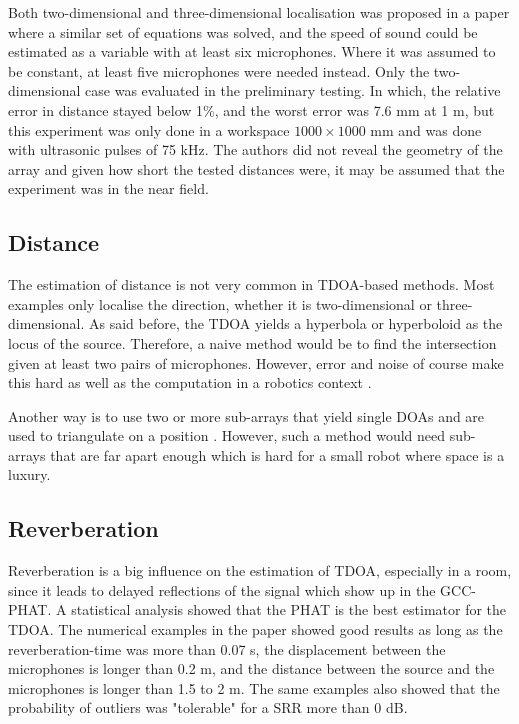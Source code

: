 \documentclass[notitlepage]{report}
\begin{document}
Both two-dimensional and three-dimensional localisation was proposed in a paper \cite{mahajan_3d_2001} where a similar set of equations was solved, and the speed of sound could be estimated as a variable with at least six microphones. Where it was assumed to be constant, at least five microphones were needed instead. Only the two-dimensional case was evaluated in the preliminary testing. In which, the relative error in distance stayed below 1\%, and the worst error was 7.6 \si{mm} at 1 \si{m}, but this experiment was only done in a workspace $1000\times 1000$ \si{mm} and was done with ultrasonic pulses of 75 \si{kHz}. The authors did not reveal the geometry of the array and given how short the tested distances were, it may be assumed that the experiment was in the near field.

\subsection{Distance}

The estimation of distance is not very common in TDOA-based methods. Most examples only localise the direction, whether it is two-dimensional or three-dimensional. As said before, the TDOA yields a hyperbola or hyperboloid as the locus of the source. Therefore, a naive method would be to find the intersection given at least two pairs of microphones. However, error and noise of course make this hard as well as the computation in a robotics context \cite{rascon_localization_2017}.

Another way is to use two or more sub-arrays that yield single DOAs and are used to triangulate on a position \cite{rascon_localization_2017}. However, such a method would need sub-arrays that are far apart enough which is hard for a small robot where space is a luxury.


\subsection{Reverberation}

Reverberation is a big influence on the estimation of TDOA, especially in a room, since it leads to delayed reflections of the signal which show up in the GCC-PHAT. A statistical analysis \cite{gustafsson_source_2003} showed that the PHAT is the best estimator for the TDOA. The numerical examples in the paper showed good results as long as the reverberation-time was more than 0.07 \si{s}, the displacement between the microphones is longer than 0.2 \si{m}, and the distance between the source and the microphones is longer than 1.5 to 2 \si{m}. The same examples also showed that the probability of outliers was "tolerable" for a SRR more than 0 \si{dB}.
\end{document}
